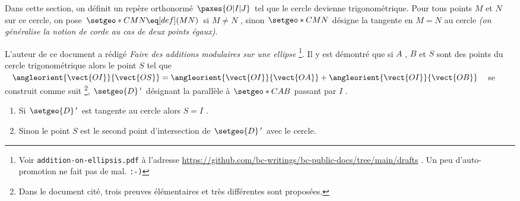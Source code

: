 Dans cette section, on définit un repère orthonormé $\paxes{O | I | J}$ tel que le cercle devienne trigonométrique.
Pour tous points $M$  et $N$ sur ce cercle, on pose $\setgeo*{C}{MN} \eq[def] (MN)$ si $M \neq N$ , sinon $\setgeo*{C}{MN}$ désigne la tangente en $M = N$ au cercle \emph{(on généralise la notion de corde au cas de deux points égaux)}.


\medskip


L'auteur de ce document a rédigé \emph{\og Faire des additions modulaires sur une ellipse \fg}
\footnote{
	Voir \texttt{addition-on-ellipsis.pdf} à l'adresse \url{https://github.com/bc-writings/bc-public-docs/tree/main/drafts} .
	Un peu d'auto-promotion ne fait pas de mal. \texttt{:-)}
}.
Il y est démontré que si $A$ , $B$ et $S$ sont des points du cercle trigonométrique alors le point $S$ tel que
$\angleorient{\vect{OI}}{\vect{OS}} = \angleorient{\vect{OI}}{\vect{OA}} + \angleorient{\vect{OI}}{\vect{OB}}$
se construit comme suit
\footnote{
	Dans le document cité, trois preuves élémentaires et très différentes sont proposées.
},
$\setgeo{D}\,'$ désignant la parallèle à $\setgeo*{C}{AB}$ passant par $I$ .

\begin{enumerate}
	\item Si $\setgeo{D}\,'$ est tangente au cercle alors $S = I$ .

	\item Sinon le point $S$ est le second point d'intersection de $\setgeo{D}\,'$ avec le cercle.
\end{enumerate}


\vspace{1em}

\begin{center}
\end{center}

